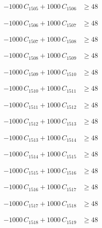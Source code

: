 \documentclass[a4paper,11pt]{article}
\begin{document}
\begin{align}
-1000\,C_{1505} + 1000\,C_{1506} &\geq 48 \nonumber
\end{align}

\begin{align}
-1000\,C_{1506} + 1000\,C_{1507} &\geq 48 \nonumber
\end{align}

\begin{align}
-1000\,C_{1507} + 1000\,C_{1508} &\geq 48 \nonumber
\end{align}

\begin{align}
-1000\,C_{1508} + 1000\,C_{1509} &\geq 48 \nonumber
\end{align}

\begin{align}
-1000\,C_{1509} + 1000\,C_{1510} &\geq 48 \nonumber
\end{align}

\begin{align}
-1000\,C_{1510} + 1000\,C_{1511} &\geq 48 \nonumber
\end{align}

\begin{align}
-1000\,C_{1511} + 1000\,C_{1512} &\geq 48 \nonumber
\end{align}

\begin{align}
-1000\,C_{1512} + 1000\,C_{1513} &\geq 48 \nonumber
\end{align}

\begin{align}
-1000\,C_{1513} + 1000\,C_{1514} &\geq 48 \nonumber
\end{align}

\begin{align}
-1000\,C_{1514} + 1000\,C_{1515} &\geq 48 \nonumber
\end{align}

\begin{align}
-1000\,C_{1515} + 1000\,C_{1516} &\geq 48 \nonumber
\end{align}

\begin{align}
-1000\,C_{1516} + 1000\,C_{1517} &\geq 48 \nonumber
\end{align}

\begin{align}
-1000\,C_{1517} + 1000\,C_{1518} &\geq 48 \nonumber
\end{align}

\begin{align}
-1000\,C_{1518} + 1000\,C_{1519} &\geq 48 \nonumber
\end{align}
\end{document}
